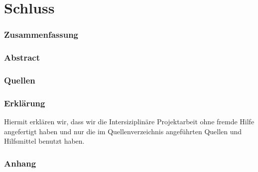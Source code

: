 \part{Schluss}
\section{Zusammenfassung}
\section{Abstract}
\section{Quellen}
\section{Erklärung}
Hiermit erklären wir, dass wir die Intersiziplinäre Projektarbeit ohne fremde Hilfe angefertigt haben und nur die im Quellenverzeichnis angeführten Quellen und Hilfsmittel benutzt haben.
\section{Anhang}
